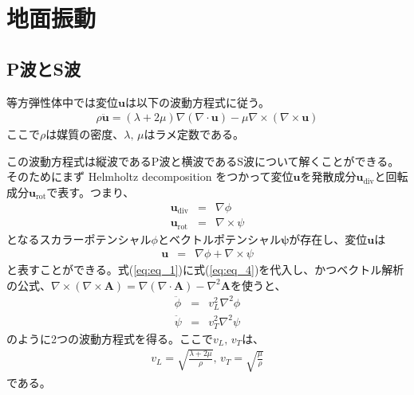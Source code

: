 \section{地面振動}

\subsection{P波とS波}

等方弾性体中では変位$\bm{u}$は以下の波動方程式に従う。
\begin{eqnarray}\label{eq:eq_1}
  \rho{\bm{\ddot{u}}} = (\lambda+2\mu)\nabla(\nabla\cdot\bm{u}) - \mu\nabla\times(\nabla\times\bm{u})
\end{eqnarray}
ここで$\rho$は媒質の密度、$\lambda,\,\mu$はラメ定数である。

この波動方程式は縦波であるP波と横波であるS波について解くことができる。そのためにまず Helmholtz decomposition をつかって変位$\bm{u}$を発散成分$\bm{u}_{\mathrm{div}}$と回転成分$\bm{u}_{\mathrm{rot}}$で表す。つまり、
\begin{eqnarray}
  \bm{u}_{\mathrm{div}}&=&\nabla\phi \label{eq:eq_2}\\
  \bm{u}_{\mathrm{rot}}&=&\nabla\times\psi \label{eq:eq_3}
\end{eqnarray}
となるスカラーポテンシャル$\phi$とベクトルポテンシャル$\bm{\psi}$が存在し、変位$\bm{u}$は
\begin{eqnarray} 
  \bm{u} &=& \nabla\phi + \nabla\times\psi \label{eq:eq_4}
\end{eqnarray}
と表すことができる。式(\ref{eq:eq_1})に式(\ref{eq:eq_4})を代入し、かつベクトル解析の公式、$\nabla\times(\nabla\times\bm{A})=\nabla(\nabla\cdot\bm{A})-\nabla^2{\bm{A}}$を使うと、
\begin{eqnarray}
  \ddot{\phi} &=& v_{L}^2\nabla^2\phi \label{eq:eq_5}\\
  \ddot{\psi} &=& v_{T}^2\nabla^2\psi \label{eq:eq_6}
\end{eqnarray} 
のように2つの波動方程式を得る。ここで$v_{L},\,v_{T}$は、
\begin{eqnarray}
  v_{L} = \sqrt{\frac{\lambda+2\mu}{\rho}},\,v_{T} = \sqrt{\frac{\mu}{\rho}} \label{eq:eq_7}
\end{eqnarray} 
である。

